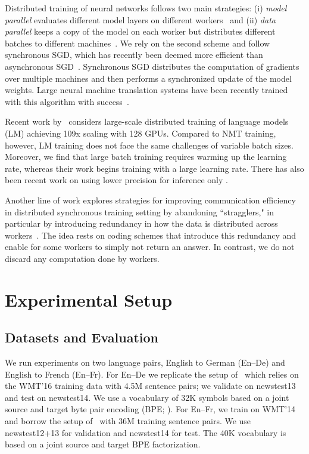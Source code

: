\documentclass[11pt,a4paper]{article}
\begin{document}
Distributed training of neural networks follows two main strategies:
(i) \emph{model parallel} evaluates different model layers on different workers~\citep{coates2013hpc} and (ii) \emph{data parallel} keeps a copy of the model on each worker but distributes different batches to different machines~\citep{dean2012distributed}.
We rely on the second scheme and follow synchronous SGD, which has recently been deemed more efficient than asynchronous SGD~\citep{chen2016distributed}. Synchronous SGD distributes the computation of gradients over multiple machines and then performs a synchronized update of the model weights. Large neural machine translation systems have been recently trained with this algorithm with success~\cite{dean2017nipsw,chen2018arxiv}.

Recent work by~\citet{puri2018large} considers large-scale distributed training of language models (LM) achieving 109x scaling with 128 GPUs.
Compared to NMT training, however, LM training does not face the same challenges of variable batch sizes.
Moreover, we find that large batch training requires warming up the learning rate, whereas their work begins training with a large learning rate.
There has also been recent work on using lower precision for inference only \cite{quinn2018bit}.

Another line of work explores strategies for improving communication efficiency in distributed synchronous training setting by abandoning ``stragglers," in particular by introducing redundancy in how the data is distributed across workers~\citep{tandon2017icml,min2018icml}.
The idea rests on coding schemes that introduce this redundancy and enable for some workers to simply not return an answer.
In contrast, we do not discard any computation done by workers.

\section{Experimental Setup}

\subsection{Datasets and Evaluation}\label{sec:datasets}

We run experiments on two language pairs, English to German (En--De) and English to French (En--Fr). 
For En--De we replicate the setup of~\citet{vaswani2017transformer} which relies on the WMT'16 training data with 4.5M sentence pairs; we validate on newstest13 and test on newstest14.
We use a vocabulary of 32K symbols based on a joint source and target byte pair encoding (BPE; \citealt{bpe}).
For En--Fr, we train on WMT'14 and borrow the setup of~\citet{gehring2017convs2s} with 36M training sentence pairs.
We use newstest12+13 for validation and newstest14 for test.
The 40K vocabulary is based on a joint source and target BPE factorization.
\end{document}

